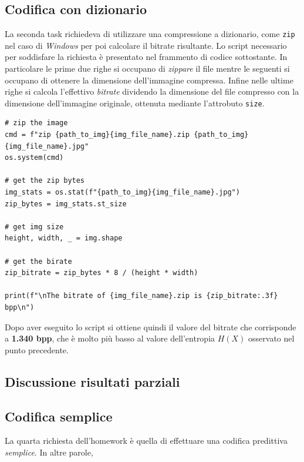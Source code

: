 \vspace{15px}\subsection{Codifica con dizionario}
La seconda task richiedeva di utilizzare una compressione a dizionario, come \texttt{zip} nel caso di \textsl{Windows} per poi calcolare il bitrate risultante. Lo script necessario per soddisfare la richiesta è presentato nel frammento di codice sottostante. In particolare le prime due righe si occupano di \textsl{zippare} il file mentre le seguenti si occupano di ottenere la dimensione dell'immagine compressa. Infine nelle ultime righe si calcola l'effettivo \textsl{bitrate} dividendo la dimensione del file compresso con la dimensione dell'immagine originale, ottenuta mediante l'attrobuto \texttt{size}.

\begin{lstlisting}
# zip the image
cmd = f"zip {path_to_img}{img_file_name}.zip {path_to_img}{img_file_name}.jpg"
os.system(cmd)

# get the zip bytes
img_stats = os.stat(f"{path_to_img}{img_file_name}.jpg")
zip_bytes = img_stats.st_size

# get img size
height, width, _ = img.shape

# get the birate
zip_bitrate = zip_bytes * 8 / (height * width) 

print(f"\nThe bitrate of {img_file_name}.zip is {zip_bitrate:.3f} bpp\n")
\end{lstlisting}

\noindent Dopo aver eseguito lo script si ottiene quindi il valore del bitrate che corrisponde a \textbf{1.340 bpp}, che è molto più basso al valore dell'entropia $H(X)$ osservato nel punto precedente.





\vspace{15px}\subsection{Discussione risultati parziali}





\vspace{15px}\subsection{Codifica semplice}
La quarta richiesta dell'homework è quella di effettuare una codifica predittiva \textsl{semplice}. In altre parole, 

